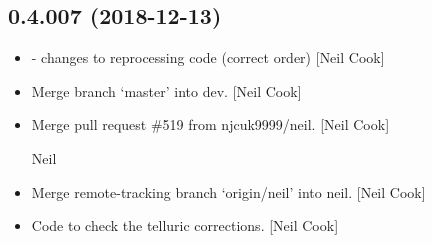 \documentclass[a4paper,10pt,english]{report}
\begin{document}
\subsection{0.4.007 (2018-12-13)}
\label{\detokenize{misc/changelog:id236}}\begin{itemize}
\item {} 
 - changes to reprocessing code (correct order)
{[}Neil Cook{]}

\item {} 
Merge branch ‘master’ into dev. {[}Neil Cook{]}

\item {} 
Merge pull request \#519 from njcuk9999/neil. {[}Neil Cook{]}

Neil

\item {} 
Merge remote-tracking branch ‘origin/neil’ into neil. {[}Neil Cook{]}

\item {} 
Code to check the telluric corrections. {[}Neil Cook{]}

\end{itemize}
\end{document}
